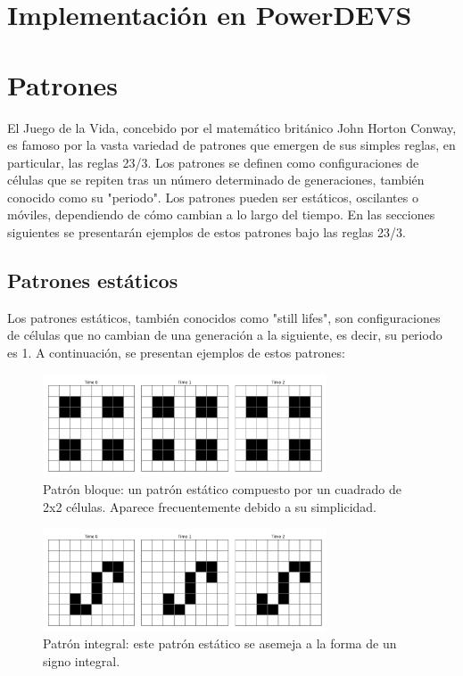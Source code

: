 \documentclass[]{article}
\begin{document}
\section{Implementación en PowerDEVS}
\section{Patrones}
El Juego de la Vida, concebido por el matemático británico John Horton Conway, es famoso por la vasta variedad de patrones que emergen de sus simples reglas, en particular, las reglas 23/3. Los patrones se definen como configuraciones de células que se repiten tras un número determinado de generaciones, también conocido como su "periodo". Los patrones pueden ser estáticos, oscilantes o móviles, dependiendo de cómo cambian a lo largo del tiempo. En las secciones siguientes se presentarán ejemplos de estos patrones bajo las reglas 23/3.

\subsection{Patrones estáticos}
Los patrones estáticos, también conocidos como "still lifes", son configuraciones de células que no cambian de una generación a la siguiente, es decir, su periodo es 1. A continuación, se presentan ejemplos de estos patrones:

\begin{figure}[H]
  \centering
  \includegraphics[width=0.75\textwidth]{../assets/still_life/block/block.png}
  \caption{Patrón bloque: un patrón estático compuesto por un cuadrado de 2x2 células. Aparece frecuentemente debido a su simplicidad.}
  \label{fig:block}
\end{figure}

\begin{figure}[H]
  \centering
  \includegraphics[width=0.75\textwidth]{../assets/still_life/integral/integral.png}
  \caption{Patrón integral: este patrón estático se asemeja a la forma de un signo integral.}
  \label{fig:integral}
\end{figure}
\end{document}
